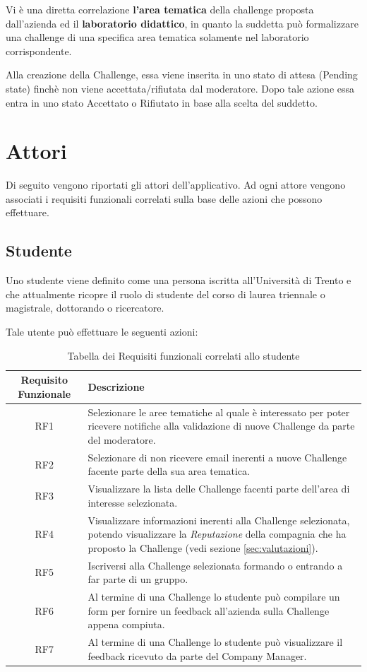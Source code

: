 Vi è una diretta correlazione \textbf{l'area tematica} della challenge proposta dall'azienda ed il \textbf{laboratorio didattico}, in quanto la suddetta può formalizzare una challenge di una specifica area tematica solamente nel laboratorio corrispondente.

Alla creazione della Challenge, essa viene inserita in uno stato di attesa (Pending state) finchè non viene accettata/rifiutata dal moderatore. Dopo tale azione essa entra in uno stato Accettato o Rifiutato in base alla scelta del suddetto.

\section{Attori}
\label{sec:attori}
Di seguito vengono riportati gli attori dell'applicativo. Ad ogni attore vengono associati i requisiti funzionali correlati sulla base delle azioni che possono effettuare.

\subsection{Studente}
\label{subsec:studente}
Uno studente viene definito come una persona iscritta all'Università di Trento e che attualmente ricopre il ruolo di studente del corso di laurea triennale o magistrale, dottorando o ricercatore.

Tale utente può effettuare le seguenti azioni:

\begin{table}[ht]
    \centering
    \begin{tabularx}{\textwidth}{|c|X|}
        \hline
        \textbf{Requisito Funzionale} & \textbf{Descrizione}\\
        \hline
        RF1 & Selezionare le aree tematiche al quale è interessato per poter ricevere notifiche alla validazione di nuove Challenge da parte del moderatore.\\
        \hline
        RF2 & Selezionare di non ricevere email inerenti a nuove Challenge facente parte della sua area tematica.\\
       \hline
        RF3 & Visualizzare la lista delle Challenge facenti parte dell'area di interesse selezionata.\\ 
        \hline
        RF4 & Visualizzare informazioni inerenti alla Challenge selezionata, potendo visualizzare la \textit{Reputazione} della compagnia che ha proposto la Challenge (vedi sezione \ref{sec:valutazioni}).\\ 
        \hline
        RF5 & Iscriversi alla Challenge selezionata formando o entrando a far parte di un gruppo.\\ 
        \hline
        RF6 & Al termine di una Challenge lo studente può compilare un form per fornire un feedback all'azienda sulla Challenge appena compiuta.\\ 
        \hline
        RF7 & Al termine di una Challenge lo studente può visualizzare il feedback ricevuto da parte del Company Manager.\\ 
        \hline
    \end{tabularx}
    \caption{Tabella dei Requisiti funzionali correlati allo studente}
\end{table}


